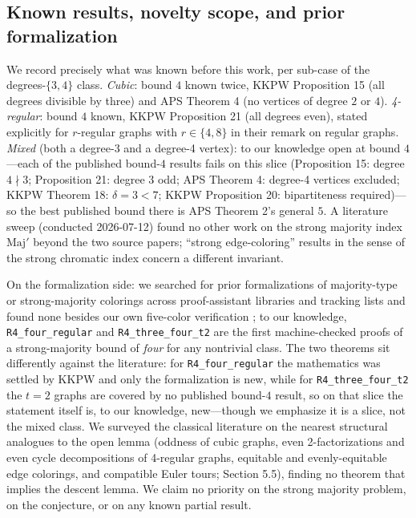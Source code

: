 \documentclass[11pt]{article}
\theoremstyle{definition}
\theoremstyle{remark}
\newcommand{\Maj}{\ensuremath{\mathrm{Maj}'}}
\begin{document}
\subsection{Known results, novelty scope, and prior formalization}\label{32-priority}

We record precisely what was known before this work, per sub-case of the degrees-$\{3,4\}$ class. \emph{Cubic}: bound $4$ known twice, KKPW Proposition 15 (all degrees divisible by three) and APS Theorem 4 (no vertices of degree $2$ or $4$). \emph{4-regular}: bound $4$ known, KKPW Proposition 21 (all degrees even), stated explicitly for $r$-regular graphs with $r \in \{4,8\}$ in their remark on regular graphs. \emph{Mixed} (both a degree-3 and a degree-4 vertex): to our knowledge open at bound $4$---each of the published bound-$4$ results fails on this slice (Proposition 15: degree $4 \nmid 3$; Proposition 21: degree $3$ odd; APS Theorem 4: degree-4 vertices excluded; KKPW Theorem 18: $\delta = 3 < 7$; KKPW Proposition 20: bipartiteness required)---so the best published bound there is APS Theorem 2's general $5$. A literature sweep (conducted 2026-07-12) found no other work on the strong majority index $\Maj$ beyond the two source papers; ``strong edge-coloring'' results in the sense of the strong chromatic index concern a different invariant.

On the formalization side: we searched for prior formalizations of majority-type or strong-majority colorings across proof-assistant libraries and tracking lists and found none besides our own five-color verification \cite{E5}; to our knowledge, \texttt{R4\_four\_regular} and \texttt{R4\_three\_four\_t2} are the first machine-checked proofs of a strong-majority bound of \emph{four} for any nontrivial class. The two theorems sit differently against the literature: for \texttt{R4\_four\_regular} the mathematics was settled by KKPW and only the formalization is new, while for \texttt{R4\_three\_four\_t2} the $t = 2$ graphs are covered by no published bound-$4$ result, so on that slice the statement itself is, to our knowledge, new---though we emphasize it is a slice, not the mixed class. We surveyed the classical literature on the nearest structural analogues to the open lemma (oddness of cubic graphs, even 2-factorizations and even cycle decompositions of 4-regular graphs, equitable and evenly-equitable edge colorings, and compatible Euler tours; Section 5.5), finding no theorem that implies the descent lemma. We claim no priority on the strong majority problem, on the conjecture, or on any known partial result.
\end{document}
